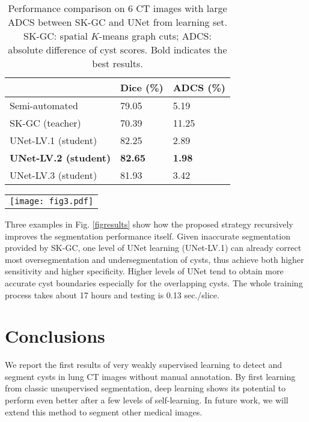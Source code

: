 \documentclass{article}
\begin{document}
\begin{table}[!t] 
\centering
\caption{Performance comparison on 6 CT images with large ADCS between SK-GC and UNet from learning set. SK-GC: spatial $K$-means graph cuts; ADCS: absolute difference of cyst scores. Bold indicates the best results.
}
\label{6slices}
\begin{tabular}{p{3cm}p{2.2cm}p{2.2cm}}
\hline
 & Dice (\%) & ADCS (\%)\\
\hline
Semi-automated \cite{yao2014sustained} & 79.05 & 5.19 \\
SK-GC (teacher) & 70.39 & 11.25 \\
UNet-LV.1 (student) & 82.25 & 2.89 \\
\textbf{UNet-LV.2 (student)} & \textbf{82.65} & \textbf{1.98} \\
UNet-LV.3 (student) & 81.93 & 3.42 \\
\hline
\end{tabular}
\end{table}

   \begin{figure*}[!t]
   \begin{center}
   \begin{tabular}{c}
   \texttt{[image: fig3.pdf]}
   \end{tabular}
   \end{center}
   \caption[example]{ \label{figresults} 
Three examples (2 good image quality and 1 noisy) show segmentation results obtained by SK-GC, UNet-level1 and UNet-level2, given manual annotation as reference. UNet-level3 is not shown due to space constraint.
}
   \end{figure*} 

Three examples in Fig. \ref{figresults} show how the proposed strategy recursively improves the segmentation performance itself. Given inaccurate segmentation provided by SK-GC, one level of UNet learning (UNet-LV.1) can already correct most oversegmentation and undersegmentation of cysts, thus achieve both higher sensitivity and higher specificity. Higher levels of UNet tend to obtain more accurate cyst boundaries especially for the overlapping cysts. The whole training process takes about 17 hours and testing is 0.13 sec./slice.


\section{Conclusions}
We report the first results of very weakly supervised learning to detect and segment cysts in lung CT images without manual annotation. By first learning from classic unsupervised segmentation, deep learning shows its potential to perform even better after a few levels of self-learning. In future work, we will extend this method to segment other medical images. 





\end{document}
